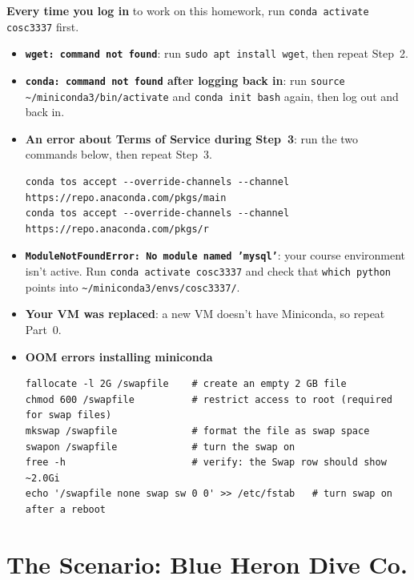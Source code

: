 \documentclass[11pt]{article}
\newcommand{\code}[1]{\texttt{#1}}
\begin{document}
\textbf{Every time you log in} to work on this homework, run \code{conda activate cosc3337} first.

\begin{warnbox}[title=Troubleshooting]
\raggedright
\begin{itemize}[nosep,leftmargin=*]
  \item \textbf{\code{wget: command not found}}: run \code{sudo apt install wget}, then repeat Step~2.
  \item \textbf{\code{conda: command not found} after logging back in}: run
    \code{source \textasciitilde/miniconda3/bin/activate} and \code{conda init bash} again, then log out and back in.
  \item \textbf{An error about Terms of Service during Step~3}: run the two commands below, then
    repeat Step~3.
\begin{lstlisting}
conda tos accept --override-channels --channel https://repo.anaconda.com/pkgs/main
conda tos accept --override-channels --channel https://repo.anaconda.com/pkgs/r
\end{lstlisting}
  \item \textbf{\code{ModuleNotFoundError: No module named 'mysql'}}: your course environment isn't
    active. Run \code{conda activate cosc3337} and check that \code{which python} points into
    \code{\textasciitilde/miniconda3/envs/cosc3337/}.
  \item \textbf{Your VM was replaced}: a new VM doesn't have Miniconda, so repeat Part~0.
  \item \textbf{OOM errors installing miniconda}
{\tiny\begin{lstlisting}
fallocate -l 2G /swapfile    # create an empty 2 GB file
chmod 600 /swapfile          # restrict access to root (required for swap files)
mkswap /swapfile             # format the file as swap space
swapon /swapfile             # turn the swap on
free -h                      # verify: the Swap row should show ~2.0Gi
echo '/swapfile none swap sw 0 0' >> /etc/fstab   # turn swap on after a reboot
\end{lstlisting}}
\end{itemize}
\end{warnbox}

\newpage
\section*{The Scenario: Blue Heron Dive Co.}
\end{document}

